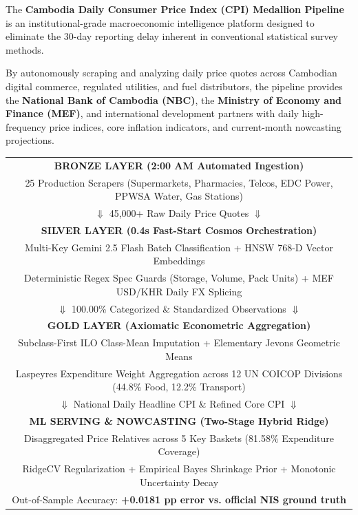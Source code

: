 \documentclass[11pt,a4paper,oneside]{article}
\begin{document}
\begin{tcolorbox}[colback=white,colframe=NavyBlue,title=\textbf{System Overview \& Institutional Mission}]
\small
The \textbf{Cambodia Daily Consumer Price Index (CPI) Medallion Pipeline} is an institutional-grade macroeconomic intelligence platform designed to eliminate the 30-day reporting delay inherent in conventional statistical survey methods. 

By autonomously scraping and analyzing daily price quotes across Cambodian digital commerce, regulated utilities, and fuel distributors, the pipeline provides the \textbf{National Bank of Cambodia (NBC)}, the \textbf{Ministry of Economy and Finance (MEF)}, and international development partners with daily high-frequency price indices, core inflation indicators, and current-month nowcasting projections.
\end{tcolorbox}

\vspace{0.3cm}

\begin{center}
\begin{tcolorbox}[colback=CodeBg,colframe=Teal,width=0.98\textwidth,title=\textbf{The Medallion Production Pipeline Topology}]
\footnotesize\ttfamily
\centering
\begin{tabular}{c}
\textbf{BRONZE LAYER (2:00 AM Automated Ingestion)} \\
25 Production Scrapers (Supermarkets, Pharmacies, Telcos, EDC Power, PPWSA Water, Gas Stations) \\
$\Downarrow$ 45,000+ Raw Daily Price Quotes $\Downarrow$ \\
\midrule
\textbf{SILVER LAYER (0.4s Fast-Start Cosmos Orchestration)} \\
Multi-Key Gemini 2.5 Flash Batch Classification + HNSW 768-D Vector Embeddings \\
Deterministic Regex Spec Guards (Storage, Volume, Pack Units) + MEF USD/KHR Daily FX Splicing \\
$\Downarrow$ 100.00\% Categorized \& Standardized Observations $\Downarrow$ \\
\midrule
\textbf{GOLD LAYER (Axiomatic Econometric Aggregation)} \\
Subclass-First ILO Class-Mean Imputation + Elementary Jevons Geometric Means \\
Laspeyres Expenditure Weight Aggregation across 12 UN COICOP Divisions (44.8\% Food, 12.2\% Transport) \\
$\Downarrow$ National Daily Headline CPI \& Refined Core CPI $\Downarrow$ \\
\midrule
\textbf{ML SERVING \& NOWCASTING (Two-Stage Hybrid Ridge)} \\
Disaggregated Price Relatives across 5 Key Baskets (81.58\% Expenditure Coverage) \\
RidgeCV Regularization + Empirical Bayes Shrinkage Prior + Monotonic Uncertainty Decay \\
Out-of-Sample Accuracy: \textbf{+0.0181 pp error vs. official NIS ground truth}
\end{tabular}
\end{tcolorbox}
\end{center}
\end{document}
